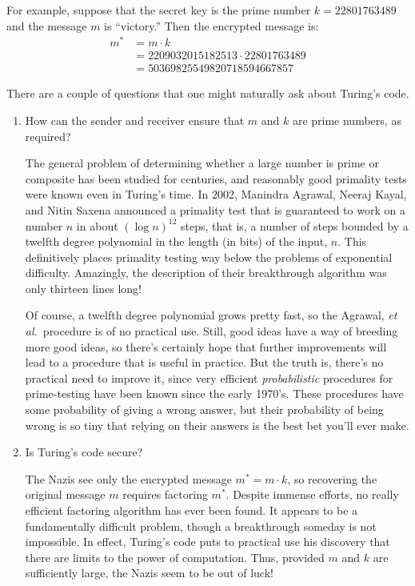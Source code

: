 For example, suppose that the secret key is the prime number $k = 22801763489$ and the
message $m$ is ``victory.''  Then the encrypted message is:
\begin{align*}
m^* & = m \cdot k \\ & = 2209032015182513 \cdot 22801763489 \\ & =
50369825549820718594667857
\end{align*}

There are a couple of questions that one might naturally ask about Turing's code.

\begin{enumerate}

\item How can the sender and receiver ensure that $m$ and $k$ are prime numbers, as
  required?

The general problem of determining whether a large number is prime or composite has been
studied for centuries, and reasonably good primality tests were known even in Turing's
time.  In 2002, Manindra Agrawal, Neeraj Kayal, and Nitin Saxena announced a primality test
that is guaranteed to work on a number $n$ in about $(\log n)^{12}$ steps, that is, a
number of steps bounded by a twelfth degree polynomial in the length (in bits) of the
input, $n$.  This definitively places primality testing way below the problems of
exponential difficulty.  Amazingly, the description of their breakthrough algorithm was
only thirteen lines long!

Of course, a twelfth degree polynomial grows pretty fast, so the Agrawal, \emph{et
  al.}\ procedure is of no practical use.  Still, good ideas have a way of breeding more
good ideas, so there's certainly hope that further improvements will lead to a procedure
that is useful in practice.  But the truth is, there's no practical need to improve it,
since very efficient \emph{probabilistic} procedures for prime-testing have been known
since the early 1970's.  These procedures have some probability of giving a wrong answer,
but their probability of being wrong is so tiny that relying on their answers is the best
bet you'll ever make.

\item Is Turing's code secure?

The Nazis see only the encrypted message $m^* = m \cdot k$, so recovering the original
message $m$ requires factoring $m^*$.  Despite immense efforts, no really efficient
factoring algorithm has ever been found.  It appears to be a fundamentally difficult
problem, though a breakthrough someday is not impossible.  In effect, Turing's code puts to
practical use his discovery that there are limits to the power of computation.  Thus,
provided $m$ and $k$ are sufficiently large, the Nazis seem to be out of luck!

\end{enumerate}

